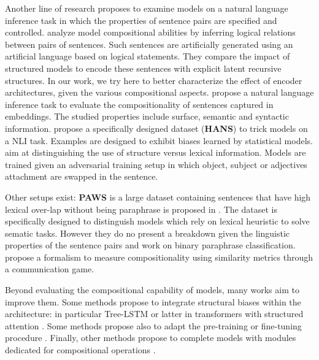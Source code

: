 Another line of research proposes to examine models on a natural language inference task in which the properties of sentence pairs are specified and controlled. 
\textcite{bowman_15} analyze model compositional abilities by inferring logical relations between pairs of sentences. Such sentences are artificially generated using an artificial language based on logical statements. They compare the impact of structured models to encode these sentences with explicit latent recursive structures. In our work, we try here to better characterize the effect of encoder architectures, given the various compositional aspects.
\textcite{dasgupta_18} propose a natural language inference task to evaluate the compositionality of sentences captured in embeddings. The studied properties include surface, semantic and syntactic information. %
\textcite{mccoy_19} propose a specifically designed dataset (\textbf{HANS}) to trick models on a NLI task. Examples are designed to exhibit biases learned by statistical models. 
\textcite{nie_19} aim at distinguishing the use of structure versus lexical information. Models are trained given an adversarial training setup in which object, subject or adjectives attachment are swapped in the sentence.


Other setups exist: \textbf{PAWS} is a large dataset containing sentences that have high lexical over-lap without being paraphrase is proposed in \textcite{zhang_19}. The dataset is specifically designed to distinguish models which rely on lexical heuristic to solve sematic tasks. However they do no present a breakdown given the linguistic properties of the sentence pairs and work on binary paraphrase classification. \textcite{andreas_19} propose a formalism to measure compositionality using similarity metrics through a communication game.

Beyond evaluating the compositional capability of models, many works aim to improve them. Some methods propose to integrate structural biases within the architecture: in particular Tree-LSTM \parencite{tai_15} or latter in transformers with structured attention \parencite{russin_19}. Some methods propose also to adapt the pre-training or fine-tuning procedure \parencite{furrer_20}. Finally, other methods propose to complete models with modules dedicated for compositional operations \parencite{liu_20, onta_21}.

